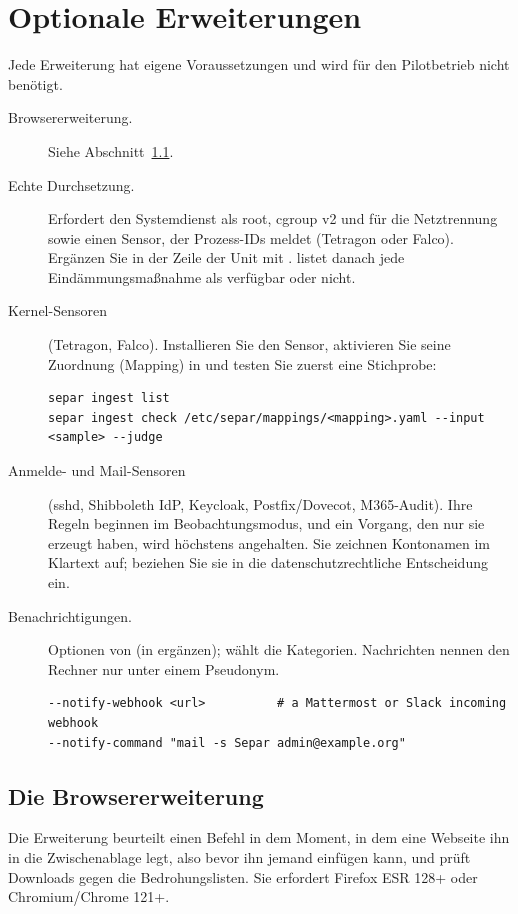 \documentclass[11pt,a4paper]{article}
\begin{document}
\section{Optionale Erweiterungen}
\label{sec:extras}
Jede Erweiterung hat eigene Voraussetzungen und wird für den Pilotbetrieb nicht benötigt.
\begin{description}
  \item[Browsererweiterung.] Siehe Abschnitt~\ref{sec:browser}.
  \item[Echte Durchsetzung.] Erfordert den Systemdienst als root, cgroup v2 und  für die
    Netztrennung sowie einen Sensor, der Prozess-IDs meldet (Tetragon oder Falco). Ergänzen Sie
     in der Zeile  der Unit mit .
     listet danach jede Eindämmungsmaßnahme als verfügbar oder nicht.
  \item[Kernel-Sensoren] (Tetragon, Falco). Installieren Sie den Sensor, aktivieren Sie seine
    Zuordnung (Mapping) in  und testen Sie zuerst eine Stichprobe:
\begin{lstlisting}
separ ingest list
separ ingest check /etc/separ/mappings/<mapping>.yaml --input <sample> --judge
\end{lstlisting}
  \item[Anmelde- und Mail-Sensoren] (sshd, Shibboleth IdP, Keycloak, Postfix/Dovecot,
    M365-Audit). Ihre Regeln beginnen im Beobachtungsmodus, und ein Vorgang, den nur sie erzeugt
    haben, wird höchstens angehalten. Sie zeichnen Kontonamen im Klartext auf; beziehen Sie sie in
    die datenschutzrechtliche Entscheidung ein.
  \item[Benachrichtigungen.] Optionen von  (in  ergänzen);
     wählt die Kategorien. Nachrichten nennen den Rechner nur unter einem
    Pseudonym.
\begin{lstlisting}
--notify-webhook <url>          # a Mattermost or Slack incoming webhook
--notify-command "mail -s Separ admin@example.org"
\end{lstlisting}
\end{description}

\subsection{Die Browsererweiterung}
\label{sec:browser}
Die Erweiterung beurteilt einen Befehl in dem Moment, in dem eine Webseite ihn in die
Zwischenablage legt, also bevor ihn jemand einfügen kann, und prüft Downloads gegen die
Bedrohungslisten. Sie erfordert Firefox ESR 128+ oder Chromium/Chrome 121+.
\end{document}
